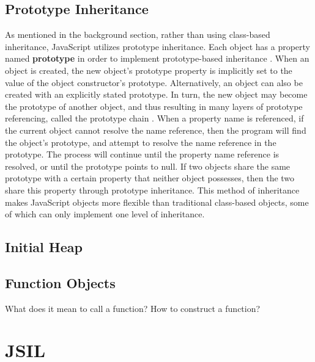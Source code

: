 \documentclass[a4paper,11pt,twoside]{report}
\begin{document}
\section{Prototype Inheritance}
As mentioned in the background section, rather than using class-based inheritance, JavaScript utilizes prototype inheritance. Each object has a property named \textbf{prototype} in order to implement prototype-based inheritance \cite{EcmaScript}. When an object is created, the new object's prototype property is implicitly set to the value of the object constructor's prototype. Alternatively, an object can also be created with an explicitly stated prototype. In turn, the new object may become the prototype of another object, and thus resulting in many layers of prototype referencing, called the prototype chain \cite{EcmaScript}. When a property name is referenced, if the current object cannot resolve the name reference, then the program will find the object's prototype, and attempt to resolve the name reference in the prototype. The process will continue until the property name reference is resolved, or until the prototype points to null. If two objects share the same prototype with a certain property that neither object possesses, then the two share this property through prototype inheritance. This method of inheritance makes JavaScript objects more flexible than traditional class-based objects, some of which can only implement one level of inheritance.

\section{Initial Heap}

\section{Function Objects}
What does it mean to call a function?
How to construct a function? 

\chapter{JSIL}\label{sec:jsil}
\end{document}

